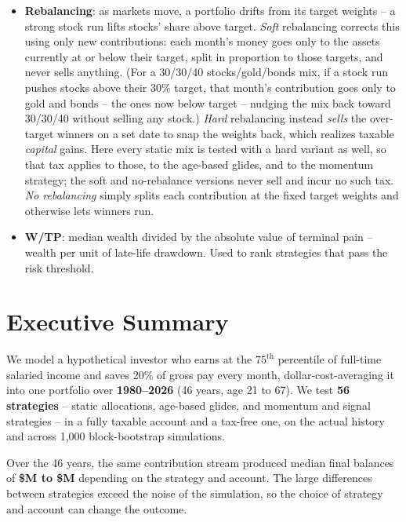 \documentclass[11pt]{article}
\begin{document}
\begin{itemize}
\emph{any} depth -- which need not be the deepest drawdown.
\item \textbf{Rebalancing}: as markets move, a portfolio drifts from its target weights -- a strong
stock run lifts stocks' share above target. \emph{Soft} rebalancing corrects this using only new
contributions: each month's money goes only to the assets currently at or below their target, split
in proportion to those targets, and never sells anything. (For a 30/30/40 stocks/gold/bonds mix, if
a stock run pushes stocks above their 30\% target, that month's contribution goes only to gold and
bonds -- the ones now below target -- nudging the mix back toward 30/30/40 without selling any
stock.) \emph{Hard} rebalancing instead \emph{sells} the over-target winners on a set date to snap
the weights back, which realizes taxable \emph{capital} gains. Here every static mix is tested with a
hard variant as well, so that tax applies to those, to the age-based glides, and to the momentum
strategy; the soft and no-rebalance versions never sell and incur no such tax. \emph{No rebalancing}
simply splits each contribution at the fixed target weights and otherwise lets winners run.
\item \textbf{W/TP}: median wealth divided by the absolute value of terminal pain -- wealth per unit of
late-life drawdown. Used to rank strategies that pass the risk threshold.
\end{itemize}

\section{Executive Summary}\label{sec:exec}

We model a hypothetical investor who earns at the $75^{\text{th}}$ percentile of full-time salaried
income and saves 20\% of gross pay every month, dollar-cost-averaging it into one portfolio over
\textbf{1980--2026} (46 years, age 21 to 67). We test \textbf{56 strategies} -- static allocations,
age-based glides, and momentum and signal strategies -- in a fully taxable account and a tax-free one,
on the actual history and across 1{,}000 block-bootstrap simulations.

Over the 46 years, the same contribution stream produced median final balances of \textbf{\$\WealthRangeLo M to \$\WealthRangeHi M} depending on the strategy and account. The large differences between strategies exceed the
noise of the simulation, so the choice of strategy and account can change the outcome.
\end{document}
